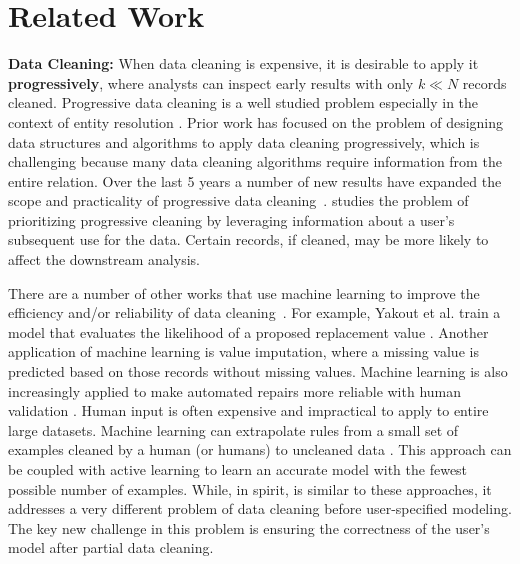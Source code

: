 \vspace{-1em}
\section{Related Work}\label{rw}
\noindent \textbf{Data Cleaning: } 
When data cleaning is expensive, it is desirable to apply it \textbf{progressively}, where analysts can inspect early results with only $k \ll N$ records cleaned.
Progressive data cleaning is a well studied problem especially in the context of entity resolution \cite{altowim2014progressive, whang2014incremental, papenbrock2015progressive, gruenheid2014incremental}.
Prior work has focused on the problem of designing data structures and algorithms to apply data cleaning progressively, which is challenging because many data cleaning algorithms require information from the entire relation.
Over the last 5 years a number of new results have expanded the scope and practicality of progressive data cleaning~\cite{mayfield2010eracer, DBLP:journals/pvldb/YakoutENOI11, yakout2013don}.
\sys studies the problem of prioritizing progressive cleaning by leveraging information about a user's subsequent use for the data.
Certain records, if cleaned, may be more likely to affect the downstream analysis.

There are a number of other works that use machine learning to improve the efficiency and/or reliability of data cleaning~\cite{DBLP:journals/pvldb/YakoutENOI11,yakout2013don,gokhale2014corleone}.
For example, Yakout et al. train a model that evaluates the likelihood of a proposed replacement value \cite{yakout2013don}.
Another application of machine learning is value imputation, where a missing value is predicted based on those records without missing values.
Machine learning is also increasingly applied to make automated repairs more reliable with human validation \cite{DBLP:journals/pvldb/YakoutENOI11}.
Human input is often expensive and impractical to apply to entire large datasets.
Machine learning can extrapolate rules from a small set of examples cleaned by a human (or humans) to uncleaned data \cite{gokhale2014corleone, DBLP:journals/pvldb/YakoutENOI11}.
This approach can be coupled with active learning \cite{DBLP:journals/pvldb/MozafariSFJM14} to learn an accurate model with the fewest possible number of examples.
While, in spirit, \sys is similar to these approaches, it addresses a very different problem of data cleaning before user-specified modeling.
The key new challenge in this problem is ensuring the correctness of the user's model after partial data cleaning.


